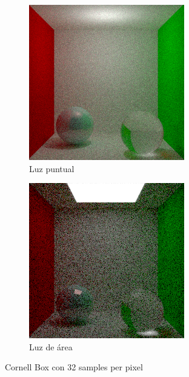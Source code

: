 \documentclass{article}
\begin{document}
\begin{figure}[H]
\begin{subfigure}[h]{0.4\linewidth}
\includegraphics[width=\linewidth]{imgs/cosine_box32.png}
\caption{Luz puntual}
\end{subfigure}
\hfill
\begin{subfigure}[h]{0.4\linewidth}
\includegraphics[width=\linewidth]{imgs/area_box32.png}
\caption{Luz de área}
\end{subfigure}%
\caption{Cornell Box con 32 samples per pixel}
\end{figure}
\end{document}
